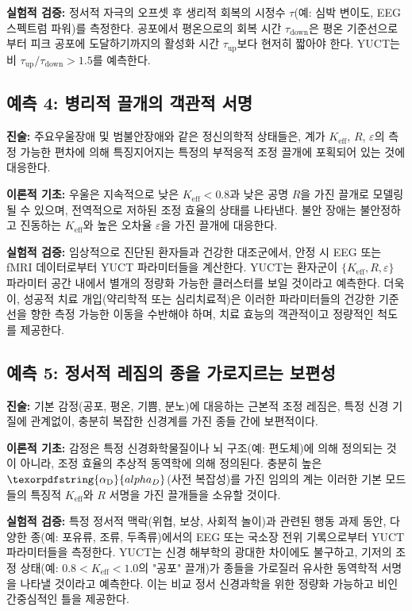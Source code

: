 \documentclass[12pt,a4paper]{article}
\DeclareRobustCommand{\alD}{\texorpdfstring{\ensuremath{\alpha_{\mathrm{D}}}}{alpha_D}}
\begin{document}
	\textbf{실험적 검증:} 정서적 자극의 오프셋 후 생리적 회복의 시정수 \(\tau\)(예: 심박 변이도, EEG 스펙트럼 파워)를 측정한다. 공포에서 평온으로의 회복 시간 \(\tau_{\text{down}}\)은 평온 기준선으로부터 피크 공포에 도달하기까지의 활성화 시간 \(\tau_{\text{up}}\)보다 현저히 짧아야 한다. YUCT는 비 \(\tau_{\text{up}}/\tau_{\text{down}} > 1.5\)를 예측한다.
	
	\subsection{예측 4: 병리적 끌개의 객관적 서명}
	
	\textbf{진술:} 주요우울장애 및 범불안장애와 같은 정신의학적 상태들은, 계가 \(K_{\mathrm{eff}}\), \(R\), \(\varepsilon\)의 측정 가능한 편차에 의해 특징지어지는 특정의 부적응적 조정 끌개에 포획되어 있는 것에 대응한다.
	
	\textbf{이론적 기초:} 우울은 지속적으로 낮은 \(K_{\mathrm{eff}} < 0.8\)과 낮은 공명 \(R\)을 가진 끌개로 모델링될 수 있으며, 전역적으로 저하된 조정 효율의 상태를 나타낸다. 불안 장애는 불안정하고 진동하는 \(K_{\mathrm{eff}}\)와 높은 오차율 \(\varepsilon\)을 가진 끌개에 대응한다.
	
	\textbf{실험적 검증:} 임상적으로 진단된 환자들과 건강한 대조군에서, 안정 시 EEG 또는 fMRI 데이터로부터 YUCT 파라미터들을 계산한다. YUCT는 환자군이 \(\{K_{\mathrm{eff}}, R, \varepsilon\}\) 파라미터 공간 내에서 별개의 정량화 가능한 클러스터를 보일 것이라고 예측한다. 더욱이, 성공적 치료 개입(약리학적 또는 심리치료적)은 이러한 파라미터들의 건강한 기준선을 향한 측정 가능한 이동을 수반해야 하며, 치료 효능의 객관적이고 정량적인 척도를 제공한다.
	
	\subsection{예측 5: 정서적 레짐의 종을 가로지르는 보편성}
	
	\textbf{진술:} 기본 감정(공포, 평온, 기쁨, 분노)에 대응하는 근본적 조정 레짐은, 특정 신경 기질에 관계없이, 충분히 복잡한 신경계를 가진 종들 간에 보편적이다.
	
	\textbf{이론적 기초:} 감정은 특정 신경화학물질이나 뇌 구조(예: 편도체)에 의해 정의되는 것이 아니라, 조정 효율의 추상적 동역학에 의해 정의된다. 충분히 높은 \(\alD\)(사전 복잡성)를 가진 임의의 계는 이러한 기본 모드들의 특징적 \(K_{\mathrm{eff}}\)와 \(R\) 서명을 가진 끌개들을 소유할 것이다.
	
	\textbf{실험적 검증:} 특정 정서적 맥락(위협, 보상, 사회적 놀이)과 관련된 행동 과제 동안, 다양한 종(예: 포유류, 조류, 두족류)에서의 EEG 또는 국소장 전위 기록으로부터 YUCT 파라미터들을 측정한다. YUCT는 신경 해부학의 광대한 차이에도 불구하고, 기저의 조정 상태(예: \(0.8 < K_{\mathrm{eff}} < 1.0\)의 "공포" 끌개)가 종들을 가로질러 유사한 동역학적 서명을 나타낼 것이라고 예측한다. 이는 비교 정서 신경과학을 위한 정량화 가능하고 비인간중심적인 틀을 제공한다.
	
\end{document}
